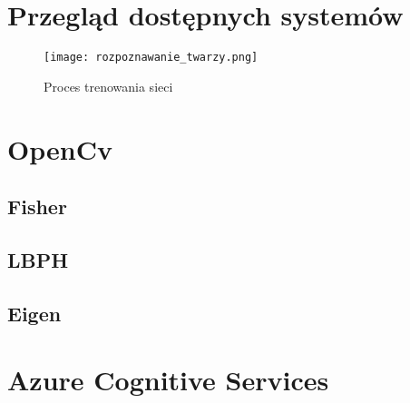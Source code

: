 \section{Przegląd dostępnych systemów}
\begin{figure}[H]
	\centering
	\texttt{[image: rozpoznawanie\_twarzy.png]}
	\caption{Proces trenowania sieci}
	\label{fig:trenowanie_proces}
\end{figure}
\section{OpenCv}
\subsection{Fisher}
\subsection{LBPH}
\subsection{Eigen}
\section{Azure Cognitive Services}